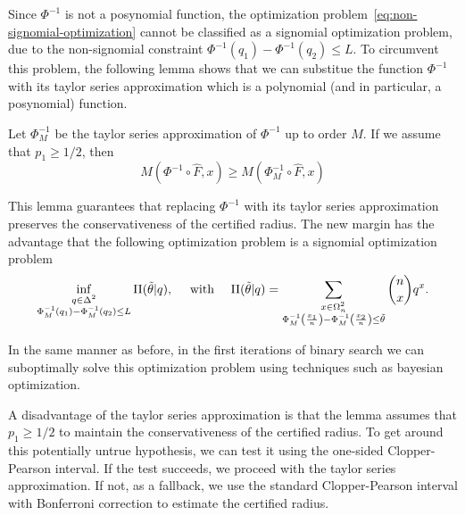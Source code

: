 Since $\Phi^{-1}$ is not a posynomial function, the optimization problem~\eqref{eq:non-signomial-optimization} cannot be classified as a signomial optimization problem, due to the non-signomial constraint $\Phi^{-1}(q_1)-\Phi^{-1}(q_2)\leq L$.
To circumvent this problem, the following lemma shows that we can substitue the function $\Phi^{-1}$ with its taylor series approximation which is a polynomial (and in particular, a posynomial) function.
\begin{lemma}
    \label{lemma:approximation}
    Let $\Phi^{-1}_M$ be the taylor series approximation of $\Phi^{-1}$ up to order $M$. If we assume that $p_1\geq1/2$, then
    \[
        M(\Phi^{-1}\circ\hat{F},x) \geq M(\Phi^{-1}_M\circ\hat{F},x)
    \]
\end{lemma}
This lemma guarantees that replacing $\Phi^{-1}$ with its taylor series approximation preserves the conservativeness of the certified radius.
The new margin has the advantage that the following optimization problem is a signomial optimization problem
\begin{equation}
    \inf_{\substack{q\in\Delta^{2}\\\Phi^{-1}_M(q_1)-\Phi^{-1}_M(q_2)\leq L}}\Pi(\Tilde{\theta}|q),\quad\text{ with }\quad\Pi(\Tilde{\theta}|q)= \sum_{\substack{x\in\Omega^{2}_n\\\Phi^{-1}_M\left(\frac{x_1}{n}\right)-\Phi^{-1}_M\left(\frac{x_2}{n}\right)\leq\Tilde{\theta}}}\binom{n}{x}q^x.\label{eq:approximated-signomial-optimization}
\end{equation}

In the same manner as before, in the first iterations of binary search we can suboptimally solve this optimization problem using techniques such as bayesian optimization.

A disadvantage of the taylor series approximation is that the lemma assumes that $p_1\geq1/2$ to maintain the conservativeness of the certified radius. To get around this potentially untrue hypothesis, we can test it using the one-sided Clopper-Pearson interval.
If the test succeeds, we proceed with the taylor series approximation.
If not, as a fallback, we use the standard Clopper-Pearson interval with Bonferroni correction to estimate the certified radius.
